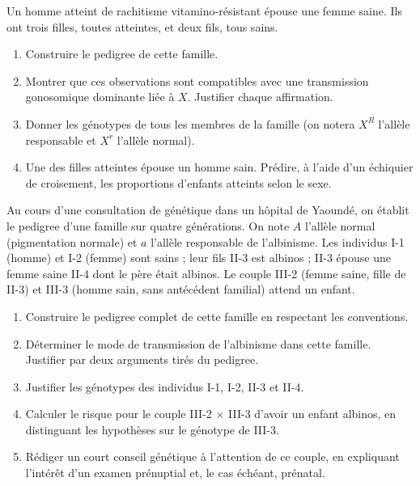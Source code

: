 \documentclass[11pt]{article}
\newcounter{popsec}
\newcounter{popsub}
\newcommand{\courssub}[1]{%
  \stepcounter{popsub}%
  \par\vspace{9pt}\noindent{\popxbold\fontsize{11.5}{13}\selectfont\color{popink}{\color{poporange}\thepopsec.\thepopsub}\hspace{6pt}#1}\par\nopagebreak\vspace{4pt}
}
\begin{document}
\begin{exercice}
Un homme atteint de rachitisme vitamino-résistant épouse une femme saine. Ils ont trois filles, toutes atteintes, et deux fils, tous sains.
\begin{enumerate}
\item Construire le pedigree de cette famille.
\item Montrer que ces observations sont compatibles avec une transmission gonosomique dominante liée à $X$. Justifier chaque affirmation.
\item Donner les génotypes de tous les membres de la famille (on notera $X^{R}$ l'allèle responsable et $X^{r}$ l'allèle normal).
\item Une des filles atteintes épouse un homme sain. Prédire, à l'aide d'un échiquier de croisement, les proportions d'enfants atteints selon le sexe.
\end{enumerate}
\end{exercice}

\courssub{Je me prépare au Bac}

\begin{exercice}
Au cours d'une consultation de génétique dans un hôpital de Yaoundé, on établit le pedigree d'une famille sur quatre générations. On note $A$ l'allèle normal (pigmentation normale) et $a$ l'allèle responsable de l'albinisme. Les individus I-1 (homme) et I-2 (femme) sont sains ; leur fils II-3 est albinos ; II-3 épouse une femme saine II-4 dont le père était albinos. Le couple III-2 (femme saine, fille de II-3) et III-3 (homme sain, sans antécédent familial) attend un enfant.
\begin{enumerate}
\item Construire le pedigree complet de cette famille en respectant les conventions.
\item Déterminer le mode de transmission de l'albinisme dans cette famille. Justifier par deux arguments tirés du pedigree.
\item Justifier les génotypes des individus I-1, I-2, II-3 et II-4.
\item Calculer le risque pour le couple III-2 $\times$ III-3 d'avoir un enfant albinos, en distinguant les hypothèses sur le génotype de III-3.
\item Rédiger un court conseil génétique à l'attention de ce couple, en expliquant l'intérêt d'un examen prénuptial et, le cas échéant, prénatal.
\end{enumerate}
\end{exercice}
\end{document}

